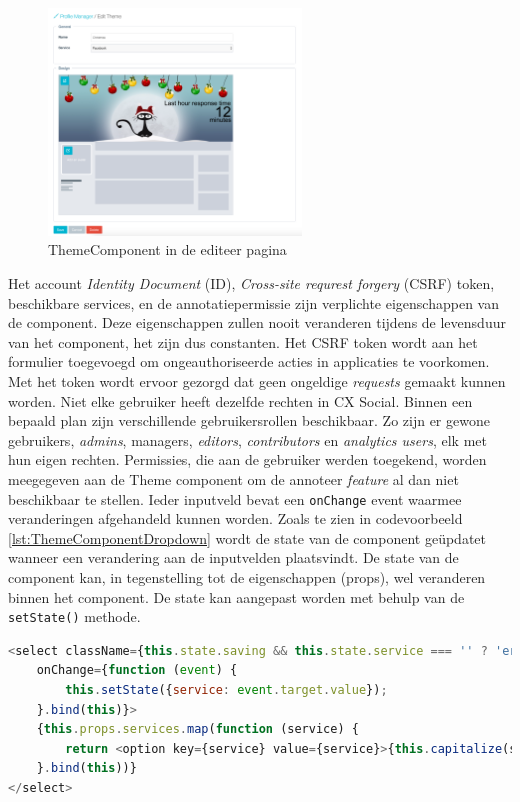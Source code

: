 \begin{figure}[H]
	\centering
	\includegraphics[width=0.6\textwidth]{Figuren/ThemeComponent.png}
	\caption{ThemeComponent in de editeer pagina}
	\label{fig:ThemeComponent}
\end{figure} 

Het account \textit{Identity Document} (ID), \textit{Cross-site requrest forgery} (CSRF) token, beschikbare services, en de annotatiepermissie zijn verplichte eigenschappen van de component. Deze eigenschappen zullen nooit veranderen tijdens de levensduur van het component, het zijn dus constanten. Het CSRF token wordt aan het formulier toegevoegd om ongeauthoriseerde acties in applicaties te voorkomen. Met het token wordt ervoor gezorgd dat geen ongeldige \textit{requests} gemaakt kunnen worden. %
Niet elke gebruiker heeft dezelfde rechten in CX Social. Binnen een bepaald plan zijn verschillende gebruikersrollen beschikbaar. Zo zijn er gewone gebruikers, \textit{admins}, managers, \textit{editors}, \textit{contributors} en \textit{analytics users}, elk met hun eigen rechten. Permissies, die aan de gebruiker werden toegekend, worden meegegeven aan de Theme component om de annoteer \textit{feature} al dan niet beschikbaar te stellen. Ieder inputveld bevat een \texttt{onChange} event waarmee veranderingen afgehandeld kunnen worden. Zoals te zien in codevoorbeeld \ref{lst:ThemeComponentDropdown} wordt de state van de component ge\"{u}pdatet wanneer een verandering aan de inputvelden plaatsvindt. De state van de component kan, in tegenstelling tot de eigenschappen (props), wel veranderen binnen het component. De state kan aangepast worden met behulp van  de \texttt{setState()} methode. 

\begin{lstlisting}[caption={Theme component - Dropdown},label=lst:ThemeComponentDropdown,language=javascript]
<select className={this.state.saving && this.state.service === '' ? 'error 		fieldset-input' : 'fieldset-input'} id="service" name="service" ref="service" value={this.getService()}
	onChange={function (event) {
		this.setState({service: event.target.value});
	}.bind(this)}>
	{this.props.services.map(function (service) {
		return <option key={service} value={service}>{this.capitalize(service)}</option>
	}.bind(this))}
</select>
\end{lstlisting}

